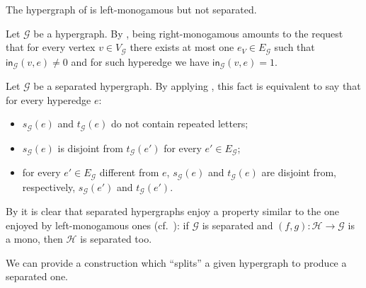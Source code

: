 \documentclass[3p]{elsarticle}
\newcommand{\ind}[1]{\mathsf{in}_{\mathcal{#1}}}
\theoremstyle{remark}
\theoremstyle{definition}
\begin{document}
\begin{exa} The hypergraph of  is left-monogamous but not separated.
\end{exa}


\begin{rem} Let $\mathcal{G}$ be a hypergraph. By , being right-monogamous amounts to the request that for every vertex $v\in V_{\mathcal{G}}$ there exists at most one $e_V\in E_{\mathcal{G}}$ such that $\ind{G}(v, e) \neq 0$ and  for such hyperedge we have $\ind{G}(v,e)=1$.
 \end{rem}
 
 \begin{rem}\label{rem:elem2}
 	Let $\mathcal{G}$ be a separated hypergraph.
 	By applying , this fact is equivalent to say that for every hyperedge $e$:
 	\begin{itemize}
 		\item $s_{\mathcal{G}}(e)$ and $t_{\mathcal{G}}(e)$ do not contain repeated letters;
 		\item $s_{\mathcal{G}}(e)$ is disjoint from $t_{\mathcal{G}}(e')$ for every $e'\in E_{\mathcal{G}}$;
 		\item for every $e'\in E_{\mathcal{G}}$ different from $e$, $s_{\mathcal{G}}(e)$ and $t_{\mathcal{G}}(e)$ are disjoint from, respectively, $s_{\mathcal{G}}(e')$ and $t_{\mathcal{G}}(e')$.
 	\end{itemize}
 \end{rem}
 
 \begin{rem}\label{rem:count}
 	By  it is clear that separated hypergraphs enjoy a property similar to the one enjoyed by left-monogamous ones (cf.~): if $\mathcal{G}$ is separated and $(f,g)\colon \mathcal{H}\to \mathcal{G}$ is a mono, then $\mathcal{H}$ is separated too.
 \end{rem}

We can provide a construction which ``splits'' a given hypergraph to produce a separated one.
\end{document}
